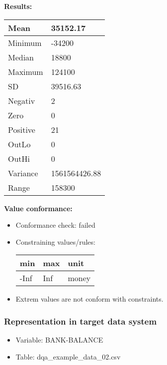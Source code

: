 \documentclass[
]{article}
\providecommand{\tightlist}{%
  \setlength{\itemsep}{0pt}\setlength{\parskip}{0pt}}
\begin{document}
\textbf{Results:}\\

\begin{table}[H]
\centering
\begin{tabular}{l|l}
\hline
Mean & 35152.17\\
\hline
Minimum & -34200\\
\hline
Median & 18800\\
\hline
Maximum & 124100\\
\hline
SD & 39516.63\\
\hline
Negativ & 2\\
\hline
Zero & 0\\
\hline
Positive & 21\\
\hline
OutLo & 0\\
\hline
OutHi & 0\\
\hline
Variance & 1561564426.88\\
\hline
Range & 158300\\
\hline
\end{tabular}
\end{table}

\textbf{Value conformance:}

\begin{itemize}
\tightlist
\item
  Conformance check: failed
\item
  Constraining values/rules:

  \begin{table}[H]
  \centering
  \begin{tabular}{l|l|l}
  \hline
  \textbf{min} & \textbf{max} & \textbf{unit}\\
  \hline
  -Inf & Inf & money\\
  \hline
  \end{tabular}
  \end{table}
\item
  Extrem values are not conform with constraints.
\end{itemize}

\newpage

\hypertarget{representation-in-target-data-system-4}{%
\subsubsection{\texorpdfstring{Representation in \textbf{target} data
system}{Representation in target data system}}\label{representation-in-target-data-system-4}}

\begin{itemize}
\tightlist
\item
  Variable: BANK-BALANCE
\item
  Table: dqa\_example\_data\_02.csv
\end{itemize}
\end{document}
